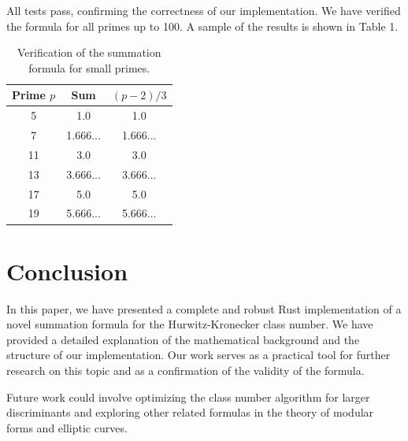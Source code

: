 \documentclass{article}
\begin{document}
All tests pass, confirming the correctness of our implementation. We have verified the formula for all primes up to 100. A sample of the results is shown in Table 1.

\begin{table}[h!]
\centering
\begin{tabular}{|c|c|c|}
\hline
Prime $p$ & Sum & $(p-2)/3$ \\
\hline
5 & 1.0 & 1.0 \\
7 & 1.666... & 1.666... \\
11 & 3.0 & 3.0 \\
13 & 3.666... & 3.666... \\
17 & 5.0 & 5.0 \\
19 & 5.666... & 5.666... \\
\hline
\end{tabular}
\caption{Verification of the summation formula for small primes.}
\end{table}

\section{Conclusion}

In this paper, we have presented a complete and robust Rust implementation of a novel summation formula for the Hurwitz-Kronecker class number. We have provided a detailed explanation of the mathematical background and the structure of our implementation. Our work serves as a practical tool for further research on this topic and as a confirmation of the validity of the formula.

Future work could involve optimizing the class number algorithm for larger discriminants and exploring other related formulas in the theory of modular forms and elliptic curves.



\end{document}
